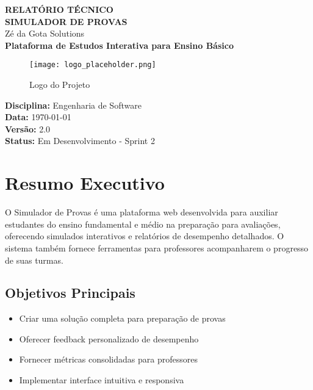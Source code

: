 \documentclass[12pt,a4paper]{article}
\begin{document}
\begin{titlepage}
    \centering
    \vspace*{2cm}
    
    {\LARGE\textbf{RELATÓRIO TÉCNICO}}\\[0.5cm]
    {\Large\textbf{SIMULADOR DE PROVAS}}\\[0.3cm]
    {\large Zé da Gota Solutions}\\[2cm]
    
    {\large\textbf{Plataforma de Estudos Interativa para Ensino Básico}}\\[1cm]
    
    \begin{figure}[H]
        \centering
        \texttt{[image: logo\_placeholder.png]}
        \caption*{Logo do Projeto}
    \end{figure}
    
    \vfill
    
    {\large
    \textbf{Disciplina:} Engenharia de Software\\
    \textbf{Data:} \today\\
    \textbf{Versão:} 2.0\\
    \textbf{Status:} Em Desenvolvimento - Sprint 2
    }
    
\end{titlepage}

\newpage

\tableofcontents
\newpage

\section{Resumo Executivo}

O Simulador de Provas é uma plataforma web desenvolvida para auxiliar estudantes do ensino fundamental e médio na preparação para avaliações, oferecendo simulados interativos e relatórios de desempenho detalhados. O sistema também fornece ferramentas para professores acompanharem o progresso de suas turmas.

\subsection{Objetivos Principais}
\begin{itemize}
    \item Criar uma solução completa para preparação de provas
    \item Oferecer feedback personalizado de desempenho
    \item Fornecer métricas consolidadas para professores
    \item Implementar interface intuitiva e responsiva
\end{itemize}
\end{document}
